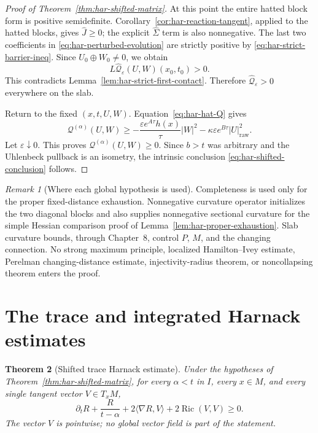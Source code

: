 \documentclass[10pt]{coll-l}
\newtheorem{theorem}{Theorem}[chapter]
\theoremstyle{definition}
\theoremstyle{remark}
\newtheorem{remark}[theorem]{Remark}
\numberwithin{section}{chapter}
\numberwithin{equation}{chapter}
\newcommand{\Ric}{\operatorname{Ric}}
\begin{document}
\begin{proof}[Proof of Theorem~\ref{thm:har-shifted-matrix}]
At this point the entire hatted block form is positive semidefinite.
Corollary~\ref{cor:har-reaction-tangent}, applied to the hatted blocks, gives
$\widehat J\geq0$; the explicit $\widehat\Sigma$ term is also nonnegative.
The last two coefficients in \eqref{eq:har-perturbed-evolution} are strictly
positive by \eqref{eq:har-strict-barrier-ineq}.  Since
$U_0\oplus W_0\ne0$, we obtain
\[
        L\widehat{\mathscr Q}_\varepsilon(U,W)(x_0,t_0)>0.
\]
This contradicts Lemma~\ref{lem:har-strict-first-contact}.  Therefore
$\widehat{\mathscr Q}_\varepsilon>0$ everywhere on the slab.

Return to the fixed $(x,t,U,W)$.  Equation~\eqref{eq:har-hat-Q} gives
\[
 \mathscr Q^{(\alpha)}(U,W)
 \geq-\frac{\varepsilon e^{A\tau}h(x)}\tau|W|^2
      -\kappa\varepsilon e^{B\tau}|U|_{\mathrm{raw}}^2.
\]
Let $\varepsilon\downarrow0$.  This proves
$\mathscr Q^{(\alpha)}(U,W)\geq0$.  Since $b>t$ was arbitrary and the
Uhlenbeck pullback is an isometry, the intrinsic conclusion
\eqref{eq:har-shifted-conclusion} follows.
\end{proof}

\begin{remark}[Where each global hypothesis is used]
\label{rem:har-hypothesis-use}
Completeness is used only for the proper fixed-distance exhaustion.
Nonnegative curvature operator initializes the two diagonal blocks and
also supplies nonnegative sectional curvature for the simple Hessian
comparison proof of Lemma~\ref{lem:har-proper-exhaustion}.  Slab curvature
bounds, through Chapter~8, control $P$, $M$, and the changing connection.
No strong maximum principle, localized Hamilton--Ivey estimate, Perelman
changing-distance estimate, injectivity-radius theorem, or noncollapsing
theorem enters the proof.
\end{remark}

\section{The trace and integrated Harnack estimates}
\label{sec:har-trace}

\begin{theorem}[Shifted trace Harnack estimate]
\label{thm:har-trace}
Under the hypotheses of Theorem~\ref{thm:har-shifted-matrix}, for every
$\alpha<t$ in $I$, every $x\in M$, and every single tangent vector
$V\in T_xM$,
\begin{equation}
 \boxed{
 \partial_tR+\frac{R}{t-\alpha}
   +2\langle\nabla R,V\rangle+2\Ric(V,V)\geq0.}          \label{eq:har-trace}
\end{equation}
The vector $V$ is pointwise; no global vector field is part of the
statement.
\end{theorem}
\end{document}
